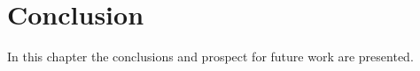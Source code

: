 \chapter{Conclusion}
\label{ch:conclusion}
In this chapter the conclusions and prospect for future work are presented.

